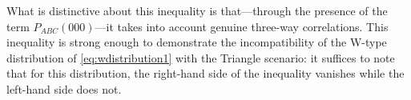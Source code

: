 What is distinctive about this inequality is that---through the presence of the term $P_{ABC}(000)$---it takes into account genuine three-way correlations.  This inequality is strong enough to demonstrate the incompatibility of the W-type distribution of \cref{eq:wdistribution1} with the Triangle scenario: it suffices to note that for this distribution, the right-hand side of the inequality vanishes while the left-hand side does not.

\bigskip



